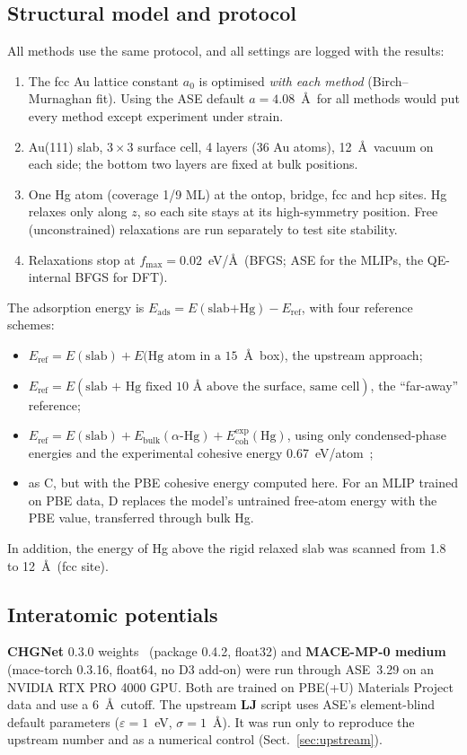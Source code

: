 \documentclass[11pt,a4paper]{article}
\newcommand{\Eads}{E_\mathrm{ads}}
\begin{document}
\subsection{Structural model and protocol}
All methods use the same protocol, and all settings are logged with the results:
\begin{enumerate}
\item The fcc Au lattice constant $a_0$ is optimised \emph{with each method} (Birch--Murnaghan fit). Using the ASE default $a=4.08$~\AA\ for all methods would put every method except experiment under strain.
\item Au(111) slab, $3\times3$ surface cell, 4 layers (36 Au atoms), 12~\AA\ vacuum on each side; the bottom two layers are fixed at bulk positions.
\item One Hg atom (coverage 1/9 ML) at the ontop, bridge, fcc and hcp sites. Hg relaxes only along $z$, so each site stays at its high-symmetry position. Free (unconstrained) relaxations are run separately to test site stability.
\item Relaxations stop at $f_\mathrm{max}=0.02$~eV/\AA\ (BFGS; ASE for the MLIPs, the QE-internal BFGS for DFT).
\end{enumerate}
The adsorption energy is $\Eads = E(\text{slab+Hg}) - E_\mathrm{ref}$, with four reference schemes:
\begin{itemize}
\item[\textbf{A}] $E_\mathrm{ref} = E(\text{slab}) + E(\text{Hg atom in a }15$~\AA\ box$)$, the upstream approach;
\item[\textbf{B}] $E_\mathrm{ref} = E(\text{slab + Hg fixed 10~\AA\ above the surface, same cell})$, the ``far-away'' reference;
\item[\textbf{C}] $E_\mathrm{ref} = E(\text{slab}) + E_\mathrm{bulk}(\alpha\text{-Hg}) + E_\mathrm{coh}^\mathrm{exp}(\mathrm{Hg})$, using only condensed-phase energies and the experimental cohesive energy 0.67~eV/atom~\cite{kittel};
\item[\textbf{D}] as C, but with the PBE cohesive energy computed here. For an MLIP trained on PBE data, D replaces the model's untrained free-atom energy with the PBE value, transferred through bulk Hg.
\end{itemize}
In addition, the energy of Hg above the rigid relaxed slab was scanned from 1.8 to 12~\AA\ (fcc site).

\subsection{Interatomic potentials}
\textbf{CHGNet} 0.3.0 weights~\cite{chgnet} (package 0.4.2, float32) and \textbf{MACE-MP-0 medium}~\cite{macemp0} (mace-torch 0.3.16, float64, no D3 add-on) were run through ASE~3.29 on an NVIDIA RTX PRO 4000 GPU. Both are trained on PBE(+U) Materials Project data and use a 6~\AA\ cutoff. The upstream \textbf{LJ} script uses ASE's element-blind default parameters ($\varepsilon=1$~eV, $\sigma=1$~\AA). It was run only to reproduce the upstream number and as a numerical control (Sect.~\ref{sec:upstream}).
\end{document}

